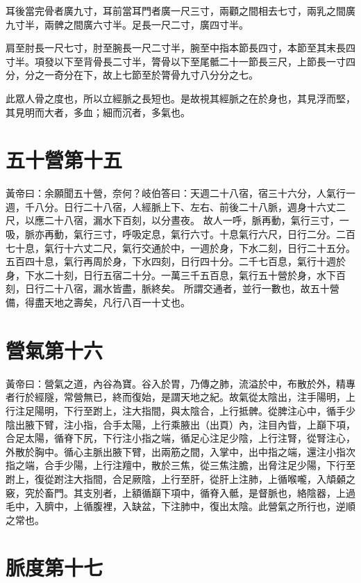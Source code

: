耳後當完骨者廣九寸，耳前當耳門者廣一尺三寸，兩顴之間相去七寸，兩乳之間廣九寸半，兩髀之間廣六寸半。足長一尺二寸，廣四寸半。

肩至肘長一尺七寸，肘至腕長一尺二寸半，腕至中指本節長四寸，本節至其末長四寸半。項發以下至背骨長二寸半，膂骨以下至尾骶二十一節長三尺，上節長一寸四分，分之一奇分在下，故上七節至於膂骨九寸八分分之七。

此眾人骨之度也，所以立經脈之長短也。是故視其經脈之在於身也，其見浮而堅，其見明而大者，多血；細而沉者，多氣也。



\section{五十營第十五}

黃帝曰：余願聞五十營，奈何？岐伯答曰：天週二十八宿，宿三十六分，人氣行一週，千八分。日行二十八宿，人經脈上下、左右、前後二十八脈，週身十六丈二尺，以應二十八宿，漏水下百刻，以分晝夜。
故人一呼，脈再動，氣行三寸，一吸，脈亦再動，氣行三寸，呼吸定息，氣行六寸。十息氣行六尺，日行二分。二百七十息，氣行十六丈二尺，氣行交通於中，一週於身，下水二刻，日行二十五分。五百四十息，氣行再周於身，下水四刻，日行四十分。二千七百息，氣行十週於身，下水二十刻，日行五宿二十分。一萬三千五百息，氣行五十營於身，水下百刻，日行二十八宿，漏水皆盡，脈終矣。
所謂交通者，並行一數也，故五十營備，得盡天地之壽矣，凡行八百一十丈也。




\section{營氣第十六}

黃帝曰：營氣之道，內谷為寶。谷入於胃，乃傳之肺，流溢於中，布散於外，精專者行於經隧，常營無已，終而復始，是謂天地之紀。故氣從太陰出，注手陽明，上行注足陽明，下行至跗上，注大指間，與太陰合，上行抵髀。從脾注心中，循手少陰出腋下臂，注小指，合手太陽，上行乘腋出（出頁）內，注目內眥，上巔下項，合足太陽，循脊下尻，下行注小指之端，循足心注足少陰，上行注腎，從腎注心，外散於胸中。循心主脈出腋下臂，出兩筋之間，入掌中，出中指之端，還注小指次指之端，合手少陽，上行注羶中，散於三焦，從三焦注膽，出脅注足少陽，下行至跗上，復從跗注大指間，合足厥陰，上行至肝，從肝上注肺，上循喉嚨，入頏顙之竅，究於畜門。其支別者，上額循巔下項中，循脊入骶，是督脈也，絡陰器，上過毛中，入臍中，上循腹裡，入缺盆，下注肺中，復出太陰。此營氣之所行也，逆順之常也。




\section{脈度第十七}

